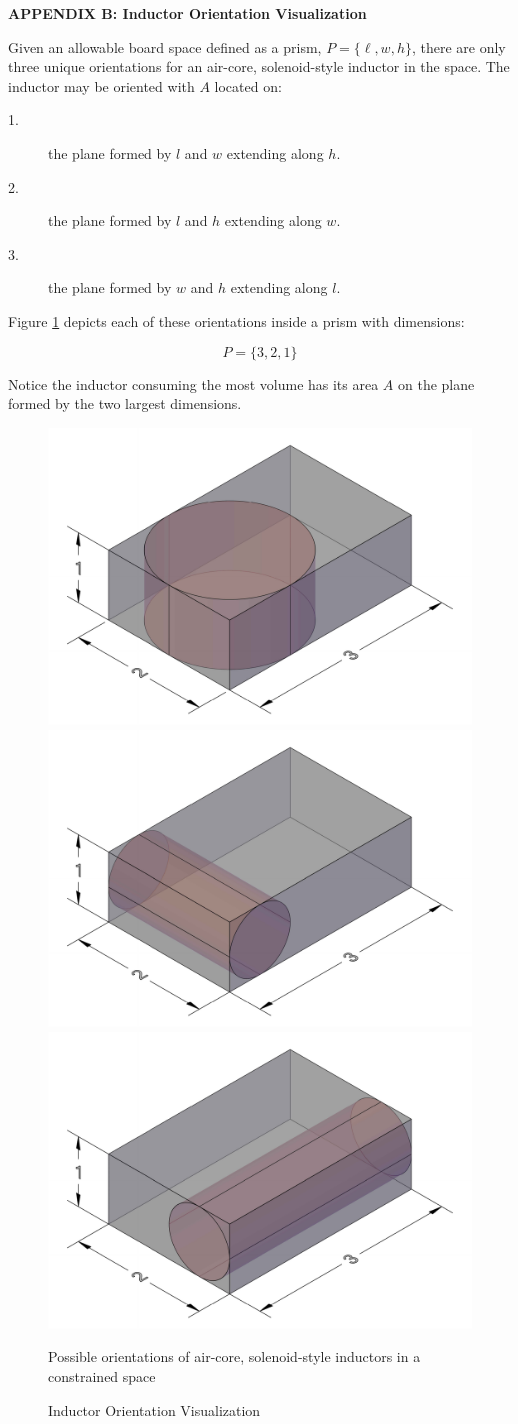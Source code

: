 \centerline{\large\bf APPENDIX B: Inductor Orientation Visualization}\label{appendix:orientation-visualization}
Given an allowable board space defined as a prism, $P = \{\ell, w, h\}$, there are only three unique orientations for an air-core, solenoid-style inductor in the space. The inductor may be oriented with $A$ located on:
\begin{description}
\item[1.] the plane formed by $l$ and $w$ extending along $h$.
\item[2.] the plane formed by $l$ and $h$ extending along $w$.
\item[3.] the plane formed by $w$ and $h$ extending along $l$.
\end{description}

Figure \ref{fig:PossibleOrientations} depicts each of these orientations inside a prism with dimensions:

\begin{equation}\label{eq:PrismSimulation}
P = \{3, 2, 1\} \nonumber
\end{equation}

Notice the inductor consuming the most volume has its area $A$ on the plane formed by the two largest dimensions.

\begin{figure}[!htbp]
    \centering
    \includegraphics[width=0.30\linewidth]{fig/xyInductorCropped.pdf}
    \includegraphics[width=0.30\linewidth]{fig/xzInductorCropped.pdf}
    \includegraphics[width=0.30\linewidth]{fig/yzInductorCropped.pdf}
    \caption{Inductor Orientation Visualization}Possible orientations of air-core, solenoid-style inductors in a constrained space
    \label{fig:PossibleOrientations}
\end{figure}